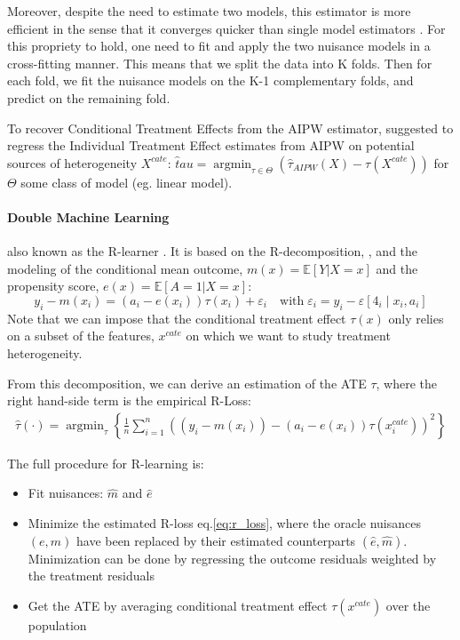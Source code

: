 \documentclass[french,12pt,twoside,a4paper]{book}
\DeclareMathOperator*{\argmin}{argmin} \def\mycitecolor{green!50!black}
\begin{document}
\begin{appendices}
\begin{background_box_left}
    Moreover, despite the need to estimate two models, this estimator is more
    efficient in the sense that it converges quicker than single model estimators
    \citep{wager2020stats}. For this propriety to hold, one need to fit and apply
    the two nuisance models in a cross-fitting manner. This means that we split
    the data into K folds. Then for each fold, we fit the nuisance models on the
    K-1 complementary folds, and predict on the remaining fold.

    To recover Conditional Treatment Effects from the AIPW estimator,
    \cite{foster2019orthogonal} suggested to regress the Individual Treatment
    Effect estimates from AIPW on potential sources of heterogeneity $X^{cate}$:
    $\hat tau = \argmin_{\tau \in \Theta} (\hat \tau_{AIPW}(X) - \tau(X^{cate}))$
    for $\Theta$ some class of model (eg. linear model).

    \paragraph{Double Machine Learning} \citep{chernozhukov2018double} also known
    as the R-learner \citep{nie2021quasi}. It is based on the R-decomposition,
    \citep{robinson_rootnconsistent_1988}, and the modeling of the conditional mean outcome,
    $m(x)=\mathbb E[Y|X=x]$ and the propensity score, $e(x)=\mathbb E[A=1|X=x]$:
    \begin{equation}\label{eq:r_decomposition_dml}
      y_{i}-m\left(x_{i}\right)=\left(a_{i}-e\left(x_{i}\right)\right) \tau\left(x_{i}\right)+\varepsilon_{i} \quad \text{with} \; \varepsilon_{i}=y_{i}-\varepsilon\left[4_{i} \mid x_{i}, a_{i}\right]
    \end{equation}
    Note that we can impose that the conditional treatment effect $\tau(x)$ only
    relies on a subset of the features, $x^{cate}$ on which we want to study
    treatment heterogeneity.

    From this decomposition, we can derive an estimation of the ATE $\tau$, where
    the right hand-side term is the empirical R-Loss:
    \begin{align}\label{eq:r_loss}
      \hat{\tau}(\cdot)=\operatorname{argmin}_{\tau}\left\{\frac{1}{n} \sum_{i=1}^{n}\left(\left(y_{i}-m\left(x_{i}\right)\right)-\left(a_{i}-e(x_{i})\right) \tau\left(x^{cate}_{i}\right)\right)^{2}\right\}
    \end{align}

    The full procedure for R-learning is:
    \begin{itemize}
      \item Fit nuisances: $\hat m$ and $\hat e$
      \item Minimize the estimated R-loss eq.\ref{eq:r_loss}, where the oracle nuisances $(e, m)$
            have been replaced by their estimated counterparts $(\hat e, \hat m)$.
            Minimization can be done by regressing the outcome residuals weighted by the
            treatment residuals
      \item Get the ATE by averaging conditional treatment effect $\tau(x^{cate})$ over the population
    \end{itemize}


\end{background_box_left}
\end{appendices}
\end{document}
